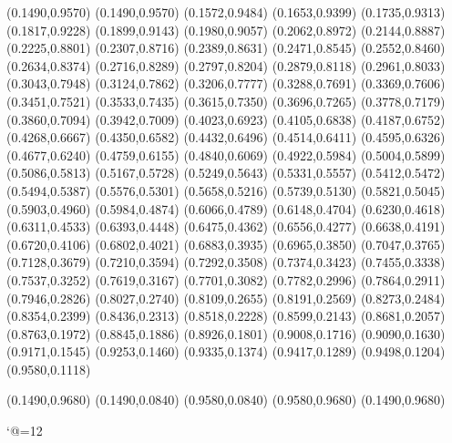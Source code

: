 \PST@Dashed(0.1490,0.9570)
(0.1490,0.9570)           
(0.1572,0.9484)           
(0.1653,0.9399)           
(0.1735,0.9313)           
(0.1817,0.9228)           
(0.1899,0.9143)           
(0.1980,0.9057)           
(0.2062,0.8972)           
(0.2144,0.8887)           
(0.2225,0.8801)           
(0.2307,0.8716)           
(0.2389,0.8631)           
(0.2471,0.8545)           
(0.2552,0.8460)           
(0.2634,0.8374)           
(0.2716,0.8289)           
(0.2797,0.8204)           
(0.2879,0.8118)           
(0.2961,0.8033)           
(0.3043,0.7948)           
(0.3124,0.7862)           
(0.3206,0.7777)           
(0.3288,0.7691)           
(0.3369,0.7606)           
(0.3451,0.7521)           
(0.3533,0.7435)           
(0.3615,0.7350)           
(0.3696,0.7265)           
(0.3778,0.7179)           
(0.3860,0.7094)           
(0.3942,0.7009)           
(0.4023,0.6923)           
(0.4105,0.6838)           
(0.4187,0.6752)           
(0.4268,0.6667)           
(0.4350,0.6582)           
(0.4432,0.6496)           
(0.4514,0.6411)           
(0.4595,0.6326)           
(0.4677,0.6240)           
(0.4759,0.6155)           
(0.4840,0.6069)           
(0.4922,0.5984)           
(0.5004,0.5899)           
(0.5086,0.5813)           
(0.5167,0.5728)           
(0.5249,0.5643)           
(0.5331,0.5557)           
(0.5412,0.5472)           
(0.5494,0.5387)           
(0.5576,0.5301)           
(0.5658,0.5216)           
(0.5739,0.5130)           
(0.5821,0.5045)           
(0.5903,0.4960)           
(0.5984,0.4874)           
(0.6066,0.4789)           
(0.6148,0.4704)           
(0.6230,0.4618)           
(0.6311,0.4533)           
(0.6393,0.4448)           
(0.6475,0.4362)           
(0.6556,0.4277)           
(0.6638,0.4191)           
(0.6720,0.4106)           
(0.6802,0.4021)           
(0.6883,0.3935)           
(0.6965,0.3850)           
(0.7047,0.3765)           
(0.7128,0.3679)           
(0.7210,0.3594)           
(0.7292,0.3508)           
(0.7374,0.3423)           
(0.7455,0.3338)           
(0.7537,0.3252)
(0.7619,0.3167)
(0.7701,0.3082)
(0.7782,0.2996)
(0.7864,0.2911)
(0.7946,0.2826)
(0.8027,0.2740)
(0.8109,0.2655)
(0.8191,0.2569)
(0.8273,0.2484)
(0.8354,0.2399)
(0.8436,0.2313)
(0.8518,0.2228)
(0.8599,0.2143)
(0.8681,0.2057)
(0.8763,0.1972)
(0.8845,0.1886)
(0.8926,0.1801)
(0.9008,0.1716)
(0.9090,0.1630)
(0.9171,0.1545)
(0.9253,0.1460)
(0.9335,0.1374)
(0.9417,0.1289)
(0.9498,0.1204)
(0.9580,0.1118)

\PST@Border(0.1490,0.9680)
(0.1490,0.0840)
(0.9580,0.0840)
(0.9580,0.9680)
(0.1490,0.9680)

\catcode`@=12
\fi
\endpspicture
